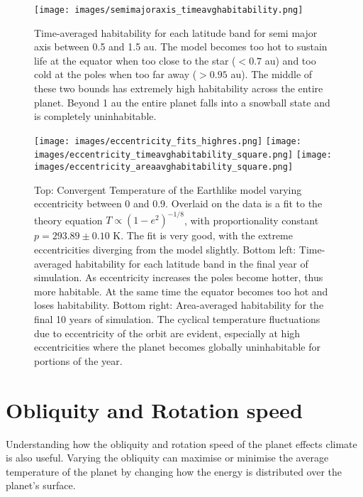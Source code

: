\documentclass[12pt, onecolumn]{revtex4-2}    %
\begin{document}
\begin{figure}
    \texttt{[image: images/semimajoraxis\_timeavghabitability.png]}
    \caption{
        Time-averaged habitability for each latitude band for semi major axis between 0.5 and 1.5 au.
        The model becomes too hot to sustain life at the equator when too close to the star ($<0.7$ au) and too cold at the poles when too far away ($>0.95$ au).
        The middle of these two bounds has extremely high habitability across the entire planet.
        Beyond 1 au the entire planet falls into a snowball state and is completely uninhabitable.
    }
\end{figure}

\begin{figure}
    \texttt{[image: images/eccentricity\_fits\_highres.png]}
    \texttt{[image: images/eccentricity\_timeavghabitability\_square.png]}
    \texttt{[image: images/eccentricity\_areaavghabitability\_square.png]}
    \caption{Top: Convergent Temperature of the Earthlike model varying eccentricity between 0 and 0.9.
        Overlaid on the data is a fit to the theory equation $T\propto(1-e^2)^{-1/8}$, with proportionality constant $p=293.89 \pm 0.10$ K.
        The fit is very good, with the extreme eccentricities diverging from the model slightly.
        Bottom left: Time-averaged habitability for each latitude band in the final year of simulation.
        As eccentricity increases the poles become hotter, thus more habitable.
        At the same time the equator becomes too hot and loses habitability.
        Bottom right: Area-averaged habitability for the final 10 years of simulation.
        The cyclical temperature fluctuations due to eccentricity of the orbit are evident, especially at high eccentricities where the planet becomes globally uninhabitable for portions of the year.
    }
    \label{fig:temperature_eccentricity}
\end{figure}

\section{Obliquity and Rotation speed}

Understanding how the obliquity and rotation speed of the planet effects climate is also useful.
Varying the obliquity can maximise or minimise the average temperature of the planet by changing how the energy is distributed over the planet's surface.
\end{document}
